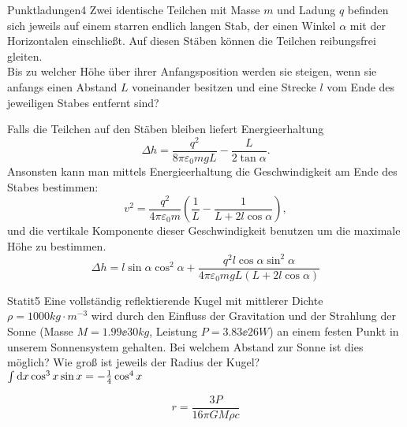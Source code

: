 



\begin{problem}{Punktladungen}{4}
Zwei identische Teilchen mit Masse $m$ und Ladung $q$ befinden sich jeweils auf einem starren endlich langen Stab, der einen Winkel $\alpha$ mit der Horizontalen einschließt. Auf diesen Stäben können die Teilchen reibungsfrei gleiten.\\
Bis zu welcher Höhe über ihrer Anfangsposition werden sie steigen, wenn sie anfangs einen Abstand $L$ voneinander besitzen und eine Strecke $l$ vom Ende des jeweiligen Stabes entfernt sind?
\begin{solution}
Falls die Teilchen auf den Stäben bleiben liefert Energieerhaltung
\[
\Delta h=\frac{q^2}{8 \pi \varepsilon_0 m g L}-\frac{L}{2 \tan\alpha}.
\]
Ansonsten kann man mittels Energieerhaltung die Geschwindigkeit am Ende des Stabes bestimmen:
\[
v^2 = \frac{q^2}{4 \pi \varepsilon_0 m} \left( \frac1{L} - \frac1{L+2 l \cos\alpha} \right),
\]
und die vertikale Komponente dieser Geschwindigkeit benutzen um die maximale Höhe zu bestimmen.
\[
\Delta h=l \sin\alpha \cos^2 \alpha+ \frac{q^2 l \cos\alpha \sin^2 \alpha}{4 \pi \varepsilon_0 m g L (L+2 l \cos\alpha)}
\]
\end{solution}
\end{problem}

\begin{problem}{Statit}{5}
Eine vollständig reflektierende Kugel mit mittlerer Dichte $\rho=1000 \unit{kg\cdot m^{-3}}$ wird durch den Einfluss der Gravitation und der Strahlung der Sonne (Masse $M=1.99 \ee{30} \unit{kg}$, Leistung $P=3.83 \ee{26} \unit{W}$) an einem festen Punkt in unserem Sonnensystem gehalten. Bei welchem Abstand zur Sonne ist dies möglich? Wie groß ist jeweils der Radius der Kugel?\\
\hinweis $\int \mathrm{d} x \cos^3 x \sin x=-\frac 14 \cos^4 x$ 

\begin{solution}
\[
r=\frac{3 P}{16 \pi G M \rho c}
\]
\end{solution}
\end{problem}

